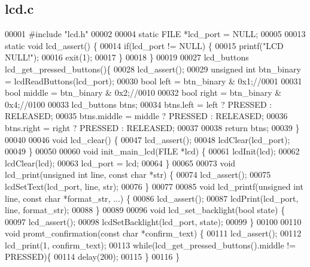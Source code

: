 \subsection{lcd.\+c}
\label{lcd_8c_source}

\begin{DoxyCode}
00001 \textcolor{preprocessor}{#include "lcd.h"}
00002 
00004 \textcolor{keyword}{static} FILE *lcd_port = NULL;
00005 
00013  \textcolor{keyword}{static} \textcolor{keywordtype}{void} lcd_assert() \{
00014   \textcolor{keywordflow}{if}(lcd_port != NULL) \{
00015     printf(\textcolor{stringliteral}{"LCD NULL!"});
00016     exit(1);
00017   \}
00018 \}
00019 
00027 lcd_buttons lcd_get_pressed_buttons()\{
00028   lcd_assert();
00029   \textcolor{keywordtype}{unsigned} \textcolor{keywordtype}{int} btn\_binary = lcdReadButtons(lcd_port);
00030   \textcolor{keywordtype}{bool} left = btn\_binary & 0x1;\textcolor{comment}{//0001}
00031   \textcolor{keywordtype}{bool} middle = btn\_binary & 0x2;\textcolor{comment}{//0010}
00032   \textcolor{keywordtype}{bool} right = btn\_binary & 0x4;\textcolor{comment}{//0100}
00033   lcd_buttons btns;
00034   btns.left = left ? PRESSED : RELEASED;
00035   btns.middle = middle ? PRESSED : RELEASED;
00036   btns.right = right ? PRESSED : RELEASED;
00037 
00038   \textcolor{keywordflow}{return} btns;
00039 \}
00040 
00046 \textcolor{keywordtype}{void} lcd_clear() \{
00047   lcd_assert();
00048   lcdClear(lcd_port);
00049 \}
00050 
00060 \textcolor{keywordtype}{void} init_main_lcd(FILE *lcd) \{
00061   lcdInit(lcd);
00062   lcdClear(lcd);
00063   lcd_port = lcd;
00064 \}
00065 
00073 \textcolor{keywordtype}{void} lcd_print(\textcolor{keywordtype}{unsigned} \textcolor{keywordtype}{int} line, \textcolor{keyword}{const} \textcolor{keywordtype}{char} *str) \{
00074   lcd_assert();
00075   lcdSetText(lcd_port, line, str);
00076 \}
00077 
00085 \textcolor{keywordtype}{void} lcd_printf(\textcolor{keywordtype}{unsigned} \textcolor{keywordtype}{int} line, \textcolor{keyword}{const} \textcolor{keywordtype}{char} *format\_str, ...) \{
00086   lcd_assert();
00087   lcdPrint(lcd_port, line, format\_str);
00088 \}
00089 
00096 \textcolor{keywordtype}{void} lcd_set_backlight(\textcolor{keywordtype}{bool} state) \{
00097   lcd_assert();
00098   lcdSetBacklight(lcd_port, state);
00099 \}
00100 
00110 \textcolor{keywordtype}{void} promt_confirmation(\textcolor{keyword}{const} \textcolor{keywordtype}{char} *confirm\_text) \{
00111   lcd_assert();
00112   lcd_print(1, confirm\_text);
00113   \textcolor{keywordflow}{while}(lcd_get_pressed_buttons().middle != PRESSED)\{
00114     delay(200);
00115   \}
00116 \}
\end{DoxyCode}

